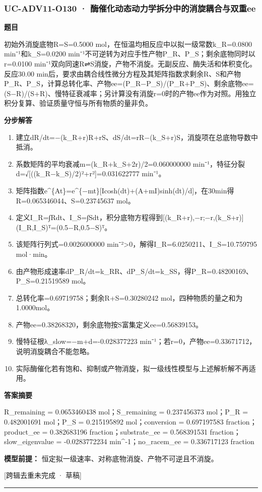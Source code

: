 \documentclass[UTF8,11pt,a4paper]{ctexart}
\begin{document}
\subsubsection*{UC-ADV11-O130 · 酶催化动态动力学拆分中的消旋耦合与双重ee}
\noindent\textbf{题目}\par
初始外消旋底物R=S=0.5000 mol，在恒温均相反应中以拟一级常数k\_R=0.0800 min⁻¹和k\_S=0.0200 min⁻¹不可逆转为对应手性产物P\_R、P\_S；剩余底物同时以r=0.0100 min⁻¹双向同速R⇌S消旋，产物不消旋。无副反应、酶失活和体积变化。反应30.00 min后，要求由耦合线性微分方程及其矩阵指数求剩余R、S和产物P\_R、P\_S，计算总转化率、产物ee=(P\_R−P\_S)/(P\_R+P\_S)、剩余底物ee=(S−R)/(S+R)、慢特征衰减率；另计算没有消旋r=0时的产物ee作为对照。用独立积分复算、验证质量守恒与所有物质的量非负。\par
\medskip\noindent\textbf{分步解答}
\begin{enumerate}
\item 建立dR/dt=−(k\_R+r)R+rS、dS/dt=rR−(k\_S+r)S，消旋项在总底物导数中抵消。
\item 系数矩阵的平均衰减m=(k\_R+k\_S+2r)/2=0.060000000 min⁻¹，特征分裂d=√[((k\_R−k\_S)/2)²+r²]=0.031622777 min⁻¹。
\item 矩阵指数e\textasciicircum{}\{At\}=e\textasciicircum{}\{−mt\}[Icosh(dt)+(A+mI)sinh(dt)/d]，在30min得R=0.065346044、S=0.23745637 mol。
\item 定义I\_R=∫Rdt、I\_S=∫Sdt，积分底物方程得到[(k\_R+r),−r;−r,(k\_S+r)](I\_R,I\_S)ᵀ=(0.5−R,0.5−S)ᵀ。
\item 该矩阵行列式=0.0026000000 min⁻²>0，解得I\_R=6.0250211、I\_S=10.759795 mol·min。
\item 由产物形成速率dP\_R/dt=k\_RR、dP\_S/dt=k\_SS，得P\_R=0.48200169、P\_S=0.21519589 mol。
\item 总转化率=0.69719758；剩余R+S=0.30280242 mol，四种物质的量之和为1.0000mol。
\item 产物ee=0.38268320，剩余底物按S富集定义ee=0.56839153。
\item 慢特征根λ\_slow=−m+d=-0.028377223 min⁻¹；若r=0，产物ee=0.33671712，说明消旋耦合不能忽略。
\item 实际酶催化若有饱和、抑制或产物消旋，拟一级线性模型与上述解析解不再适用。
\end{enumerate}
\noindent\textbf{答案摘要}\par
R\_remaining = 0.0653460438 mol；S\_remaining = 0.237456373 mol；P\_R = 0.482001691 mol；P\_S = 0.215195892 mol；conversion = 0.697197583 fraction；product\_ee = 0.382683196 fraction；substrate\_ee = 0.568391531 fraction；slow\_eigenvalue = -0.0283772234 min\textasciicircum{}-1；no\_racem\_ee = 0.336717123 fraction\par
\noindent\textbf{模型前提：}
恒定拟一级速率、对称底物消旋、产物不可逆且不消旋。\par
\noindent\textcolor{red!65!black}{[跨辑去重未完成 · 草稿]} \par
\medskip\hrule\medskip
\end{document}
